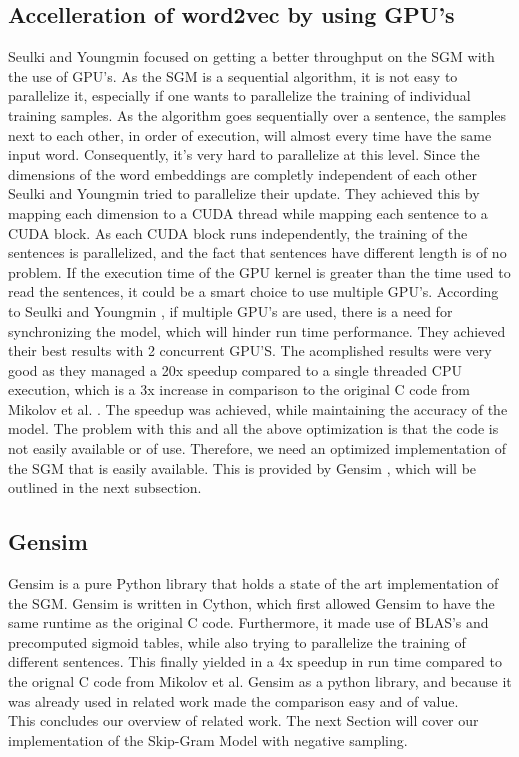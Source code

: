 \subsection{Accelleration of word2vec by using GPU's}
Seulki and Youngmin \citep{gpu} focused on getting a better throughput on the SGM with the use of GPU's. As the SGM is a sequential algorithm, it is not easy to parallelize it, especially if one wants to parallelize the training of individual training samples. As the algorithm goes sequentially over a sentence, the samples next to each other, in order of execution, will almost every time have the same input word. Consequently, it's very hard to parallelize at this level. 
Since the dimensions of the word embeddings are completly independent of each other  Seulki and Youngmin \citep{gpu} tried to parallelize their update. They achieved this by mapping each dimension to a CUDA thread while mapping each sentence to a CUDA block. As each CUDA block runs independently, the training of the sentences is parallelized, and the fact that sentences have different length is of no problem. If the execution time of the GPU kernel is greater than the time used to read the sentences, it could be a smart choice to use multiple GPU's. According to Seulki and Youngmin \citep{gpu}, if multiple GPU's are used, there is a need for synchronizing the model, which will hinder run time performance. They achieved their best results with 2 concurrent GPU'S. The acomplished results were very good as they managed a 20x speedup compared to a single threaded CPU execution, which is a 3x increase in comparison to the original C code from Mikolov et al. \citep{mikolov2}. The speedup was achieved, while maintaining the accuracy of the model. The problem with this and all the above optimization is that the code is not easily available or of use. Therefore, we need an optimized implementation of the SGM that is easily available. This is provided by Gensim \citep{gensim}, which will be outlined in the next subsection.
\subsection{Gensim}\label{ssec:gensim}
Gensim \citep{gensim} is a pure Python library that holds a state of the art implementation of the SGM. Gensim is written in Cython, which first allowed Gensim to have the same runtime as the original C code. Furthermore, it made use of BLAS's and precomputed sigmoid tables, while also trying to parallelize the training of different sentences. This finally yielded in a 4x speedup in run time compared to the orignal C code from Mikolov et al. Gensim as a python library, and because it was already used in related work \citep{intel} made the comparison easy and of value. \\ This concludes our overview of  related work. The next Section will cover our implementation of the Skip-Gram Model with negative sampling.